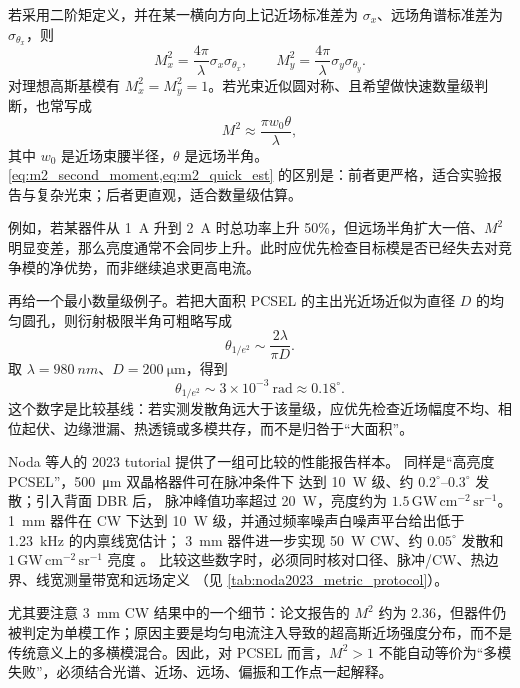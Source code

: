 若采用二阶矩定义，并在某一横向方向上记近场标准差为 $\sigma_x$、远场角谱标准差为 $\sigma_{\theta_x}$，则
\begin{equation}
M_x^2=\frac{4\pi}{\lambda}\sigma_x\sigma_{\theta_x},
\qquad
M_y^2=\frac{4\pi}{\lambda}\sigma_y\sigma_{\theta_y}.
\label{eq:m2_second_moment}
\end{equation}
对理想高斯基模有 $M_x^2=M_y^2=1$。若光束近似圆对称、且希望做快速数量级判断，也常写成
\begin{equation}
M^2\approx \frac{\pi w_0\theta}{\lambda},
\label{eq:m2_quick_est}
\end{equation}
其中 $w_0$ 是近场束腰半径，$\theta$ 是远场半角。\cref{eq:m2_second_moment,eq:m2_quick_est} 的区别是：前者更严格，适合实验报告与复杂光束；后者更直观，适合数量级估算。

例如，若某器件从 \SI{1}{A} 升到 \SI{2}{A} 时总功率上升 50\%，但远场半角扩大一倍、$M^2$ 明显变差，那么亮度通常不会同步上升。此时应优先检查目标模是否已经失去对竞争模的净优势，而非继续追求更高电流。

\begin{ExampleBox}
再给一个最小数量级例子。若把大面积 PCSEL 的主出光近场近似为直径 $D$ 的均匀圆孔，则衍射极限半角可粗略写成
\[
\theta_{1/e^2}\sim \frac{2\lambda}{\pi D}.
\]
取 $\lambda=\SI{980}{nm}$、$D=\SI{200}{\micro\meter}$，得到
\[
\theta_{1/e^2}\sim 3\times10^{-3}\ \mathrm{rad}\approx 0.18^\circ.
\]
这个数字是比较基线：若实测发散角远大于该量级，应优先检查近场幅度不均、相位起伏、边缘泄漏、热透镜或多模共存，而不是归咎于“大面积”。
\end{ExampleBox}

Noda 等人的 2023 tutorial 提供了一组可比较的性能报告样本。
同样是“高亮度 PCSEL”，\SI{500}{\micro\meter} 双晶格器件可在脉冲条件下
达到 \SI{10}{W} 级、约 $0.2^\circ$--$0.3^\circ$ 发散；引入背面 DBR 后，
脉冲峰值功率超过 \SI{20}{W}，亮度约为
\(1.5\,\mathrm{GW\,cm^{-2}\,sr^{-1}}\)。\SI{1}{mm} 器件在 CW 下达到
\SI{10}{W} 级，并通过频率噪声白噪声平台给出低于 \SI{1.23}{kHz} 的内禀线宽估计；
\SI{3}{mm} 器件进一步实现 \SI{50}{W} CW、约 $0.05^\circ$ 发散和
\(1\,\mathrm{GW\,cm^{-2}\,sr^{-1}}\) 亮度
\cite{noda2023tutorial,yoshida2019,yoshida2023}。
比较这些数字时，必须同时核对口径、脉冲/CW、热边界、线宽测量带宽和远场定义
（见 \cref{tab:noda2023_metric_protocol}）。

尤其要注意 \SI{3}{mm} CW 结果中的一个细节：论文报告的 $M^2$ 约为 2.36，但器件仍被判定为单模工作；原因主要是均匀电流注入导致的超高斯近场强度分布，而不是传统意义上的多横模混合\cite{noda2023tutorial}。因此，对 PCSEL 而言，$M^2>1$ 不能自动等价为“多模失败”，必须结合光谱、近场、远场、偏振和工作点一起解释。

